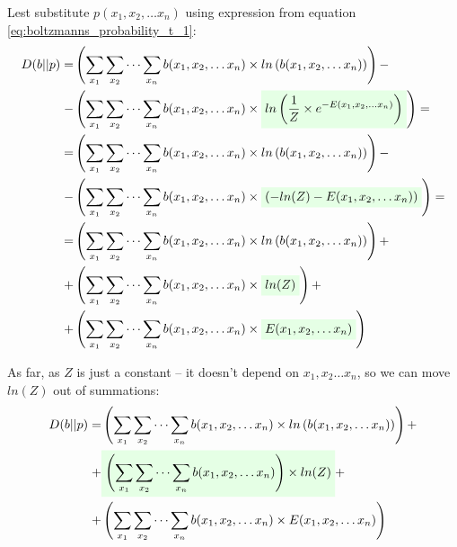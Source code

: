 \documentclass[fleqn,leqno]{article}
\newcommand{\highlight}[1]{\colorbox{green!10}{$\displaystyle#1$}}
\begin{document}
Lest substitute $p(x_1, x_2, \dots x_n)$ using expression from equation \eqref{eq:boltzmanns_probability_t_1}:
\begin{equation}
\begin{split}
D(b||p) = & \left( \sum_{x_1} \sum_{x_2} \cdots \sum_{x_n} b(x_1, x_2, \dots x_n) \times ln \left( b(x_1, x_2, \dots x_n) \right) \right) - \\
             - & \left( \sum_{x_1} \sum_{x_2} \cdots \sum_{x_n} b(x_1, x_2, \dots x_n) \times \highlight{ ln \left( {1 \over Z} \times e^{-E(x_1, x_2, \dots x_n)} \right) } \right) = \\
            = & \left( \sum_{x_1} \sum_{x_2} \cdots \sum_{x_n} b(x_1, x_2, \dots x_n) \times ln \left( b(x_1, x_2, \dots x_n) \right) \right) - \\
             - & \left( \sum_{x_1} \sum_{x_2} \cdots \sum_{x_n} b(x_1, x_2, \dots x_n) \times \highlight{ \left( -ln(Z) -E(x_1, x_2, \dots x_n) \right) } \right) = \\
            = & \left( \sum_{x_1} \sum_{x_2} \cdots \sum_{x_n} b(x_1, x_2, \dots x_n) \times ln \left( b(x_1, x_2, \dots x_n) \right) \right) + \\
            + & \left( \sum_{x_1} \sum_{x_2} \cdots \sum_{x_n} b(x_1, x_2, \dots x_n) \times \highlight{ ln(Z) } \right) + \\
             + & \left( \sum_{x_1} \sum_{x_2} \cdots \sum_{x_n} b(x_1, x_2, \dots x_n) \times \highlight{ E(x_1, x_2, \dots x_n) } \right) \\
\end{split}
\end{equation}

As far, as $Z$ is just a constant -- it doesn't depend on $x_1, x_2 \dots x_n$, so we can move $ln(Z)$ out of summations:
\begin{equation}
\begin{split}
D(b||p) = & \left( \sum_{x_1} \sum_{x_2} \cdots \sum_{x_n} b(x_1, x_2, \dots x_n) \times ln \left( b(x_1, x_2, \dots x_n) \right) \right) + \\
            + & \highlight{ \left( \sum_{x_1} \sum_{x_2} \cdots \sum_{x_n} b(x_1, x_2, \dots x_n) \right) \times ln(Z) } + \\
            + & \left( \sum_{x_1} \sum_{x_2} \cdots \sum_{x_n} b(x_1, x_2, \dots x_n) \times E(x_1, x_2, \dots x_n) \right) \\
\end{split}
\end{equation}
\end{document}
